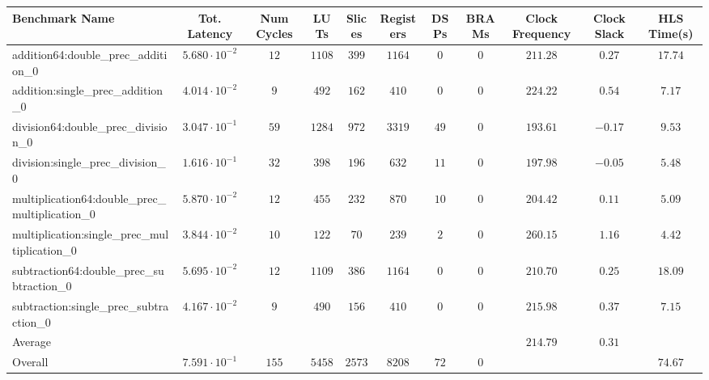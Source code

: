 \begin{tabular}{|l|c|c|c|c|c|c|c|c|c|c|}
\hline
Benchmark Name                                   & Tot. Latency            & Num Cycles & LUTs     & Slices   & Registers & DSPs   & BRAMs & Clock Frequency & Clock Slack & HLS Time(s) \\
\hline
addition64:double\_prec\_addition\_0             & $ 5.680 \cdot 10^{-2} $ & $ 12     $ & $ 1108 $ & $ 399  $ & $ 1164  $ & $ 0  $ & $ 0 $ & $ 211.28      $ & $ 0.27    $ & $ 17.74   $ \\
addition:single\_prec\_addition\_0               & $ 4.014 \cdot 10^{-2} $ & $ 9      $ & $ 492  $ & $ 162  $ & $ 410   $ & $ 0  $ & $ 0 $ & $ 224.22      $ & $ 0.54    $ & $ 7.17    $ \\
division64:double\_prec\_division\_0             & $ 3.047 \cdot 10^{-1} $ & $ 59     $ & $ 1284 $ & $ 972  $ & $ 3319  $ & $ 49 $ & $ 0 $ & $ 193.61      $ & $ -0.17   $ & $ 9.53    $ \\
division:single\_prec\_division\_0               & $ 1.616 \cdot 10^{-1} $ & $ 32     $ & $ 398  $ & $ 196  $ & $ 632   $ & $ 11 $ & $ 0 $ & $ 197.98      $ & $ -0.05   $ & $ 5.48    $ \\
multiplication64:double\_prec\_multiplication\_0 & $ 5.870 \cdot 10^{-2} $ & $ 12     $ & $ 455  $ & $ 232  $ & $ 870   $ & $ 10 $ & $ 0 $ & $ 204.42      $ & $ 0.11    $ & $ 5.09    $ \\
multiplication:single\_prec\_multiplication\_0   & $ 3.844 \cdot 10^{-2} $ & $ 10     $ & $ 122  $ & $ 70   $ & $ 239   $ & $ 2  $ & $ 0 $ & $ 260.15      $ & $ 1.16    $ & $ 4.42    $ \\
subtraction64:double\_prec\_subtraction\_0       & $ 5.695 \cdot 10^{-2} $ & $ 12     $ & $ 1109 $ & $ 386  $ & $ 1164  $ & $ 0  $ & $ 0 $ & $ 210.70      $ & $ 0.25    $ & $ 18.09   $ \\
subtraction:single\_prec\_subtraction\_0         & $ 4.167 \cdot 10^{-2} $ & $ 9      $ & $ 490  $ & $ 156  $ & $ 410   $ & $ 0  $ & $ 0 $ & $ 215.98      $ & $ 0.37    $ & $ 7.15    $ \\
\hline
Average                                          & $                     $ & $        $ & $      $ & $      $ & $       $ & $    $ & $   $ & $ 214.79      $ & $ 0.31    $ & $         $ \\
\hline
Overall                                          & $ 7.591 \cdot 10^{-1} $ & $ 155    $ & $ 5458 $ & $ 2573 $ & $ 8208  $ & $ 72 $ & $ 0 $ & $             $ & $         $ & $ 74.67   $ \\
\hline
\end{tabular}
